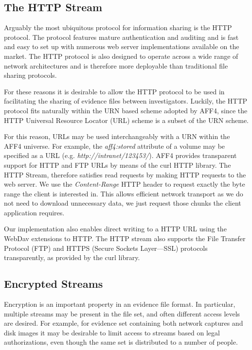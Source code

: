 \documentclass[10pt, conference]{IEEEtran}
\begin{document}
\subsection{The HTTP Stream}
Arguably the most ubiquitous protocol for information sharing is the
HTTP protocol\cite{HTTP_RFC}. The protocol features mature
authentication and auditing and is fast and easy to set up with
numerous web server implementations available on the market. The HTTP
protocol is also designed to operate across a wide range of network
architectures and is therefore more deployable than traditional file
sharing protocols.

For these reasons it is desirable to allow the HTTP protocol to be
used in facilitating the sharing of evidence files between
investigators. Luckily, the HTTP protocol fits naturally within the
URN based scheme adopted by AFF4, since the HTTP Universal Resource
Locator (URL) scheme is a subset of the URN scheme.

For this reason, URLs may be used interchangeably with a URN within
the AFF4 universe. For example, the \emph{aff4:stored} attribute of a
volume may be specified as a URL
(e.g. \emph{http://intranet/123453/}).  AFF4 provides transparent
support for HTTP and FTP URLs by means of the curl HTTP
library\cite{libcurl}. The HTTP Stream, therefore satisfies read
requests by making HTTP requests to the web server. We use the
\emph{Content-Range} HTTP header to request exactly the byte range the
client is interested in. This allows efficient network transport as we
do not need to download unnecessary data, we just request those chunks
the client application requires.

Our implementation also enables direct writing to a HTTP URL using the
WebDav extensions to HTTP\cite{webdav-rfc}. The HTTP stream also
supports the File Transfer Protocol (FTP) and HTTPS (Secure Sockets
Layer---SSL) protocols transparently, as provided by the curl library.

\subsection{Encrypted Streams}
\label{crypted_stream}
Encryption is an important property in an evidence file format. In
particular, multiple streams may be present in the file set, and often
different access levels are desired. For example, for evidence set
containing both network captures and disk images it may be desirable
to limit access to streams based on legal authorizations, even though
the same set is distributed to a number of people.
\end{document}

